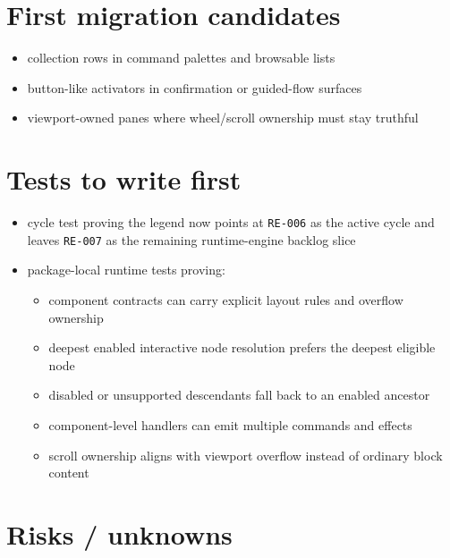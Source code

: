 \section{First migration candidates}\label{record-154-first-migration-candidates}

\begin{itemize}
\tightlist
\item
  collection rows in command palettes and browsable lists
\item
  button-like activators in confirmation or guided-flow surfaces
\item
  viewport-owned panes where wheel/scroll ownership must stay truthful
\end{itemize}

\section{Tests to write first}\label{record-154-tests-to-write-first}

\begin{itemize}
\tightlist
\item
  cycle test proving the legend now points at \texttt{R\allowbreak{}E\allowbreak{}-\allowbreak{}0\allowbreak{}0\allowbreak{}6} as the active cycle and leaves \texttt{R\allowbreak{}E\allowbreak{}-\allowbreak{}0\allowbreak{}0\allowbreak{}7} as the remaining runtime-engine backlog slice
\item
  package-local runtime tests proving:

  \begin{itemize}
  \tightlist
  \item
    component contracts can carry explicit layout rules and overflow ownership
  \item
    deepest enabled interactive node resolution prefers the deepest eligible node
  \item
    disabled or unsupported descendants fall back to an enabled ancestor
  \item
    component-level handlers can emit multiple commands and effects
  \item
    scroll ownership aligns with viewport overflow instead of ordinary block content
  \end{itemize}
\end{itemize}

\section{Risks / unknowns}\label{record-154-risks-unknowns}

